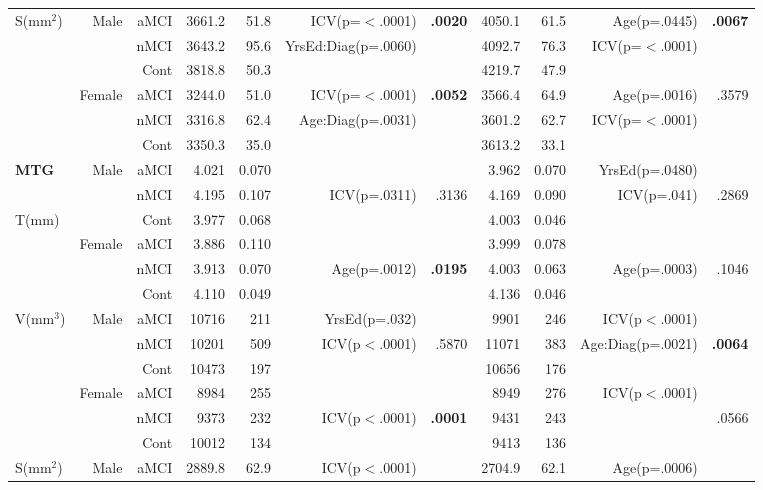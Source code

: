 \documentclass[12pt]{article}\usepackage[]{graphicx}\usepackage[]{color}
\newcommand\T{\rule{0pt}{2.6ex}}
\begin{document}
\begin{sidewaystable}
\begin{tabular}{l|rr|rrrr|rrrr}
	\hline
	\multirow{6}{*}{S(mm$^2$)} \T & \multirow{3}{*}{Male} & aMCI\T &3661.2 &51.8 & ICV(p=$<$.0001) & \textbf{.0020}&4050.1	 &61.5  & Age(p=.0445) & \textbf{.0067}  \\
							&							& nMCI & 3643.2	& 95.6	& YrsEd:Diag(p=.0060) & &4092.7 & 76.3 & ICV(p=$<$.0001) & \\
							&						& Cont & 3818.8	&50.3	& 		&  & 4219.7	& 47.9& & \\\cline{2-11}
							&	\multirow{3}{*}{Female}	& aMCI\T & 3244.0	&51.0	 & ICV(p=$<$.0001) & \textbf{.0052} & 3566.4	&64.9 & Age(p=.0016)& .3579 \\
							&						& nMCI & 3316.8	&62.4 & Age:Diag(p=.0031) & &3601.2	 & 62.7	 & ICV(p=$<$.0001) 		& \\
							&						& Cont & 3350.3& 35.0& 		& & 3613.2	& 33.1	& 		& \\
	\hline \hline
	\textbf{MTG} & \multirow{3}{*}{Male} & aMCI\T & 4.021 & 0.070 & & & 3.962 & 0.070 & YrsEd(p=.0480) & \\
							&						& nMCI & 4.195 & 0.107 & ICV(p=.0311)& .3136 & 4.169 & 0.090 & ICV(p=.041) & .2869 \\
	\multirow{2}{*}{T(mm)}						&						& Cont & 3.977 & 0.068 & & & 4.003 & 0.046 & &\\\cline{2-11}
							&	\multirow{3}{*}{Female}	& aMCI\T & 3.886 & 0.110 &  & & 3.999 & 0.078 & & \\
							&						& nMCI & 3.913 & 0.070 & Age(p=.0012)& \textbf{.0195} & 4.003 & 0.063 & Age(p=.0003) & .1046 \\
							&						& Cont & 4.110 & 0.049 & & & 4.136 & 0.046 & & \\
	\hline
	\multirow{6}{*}{V(mm$^3$)} & \multirow{3}{*}{Male} & aMCI\T & 10716 & 211 & YrsEd(p=.032)&  & 9901 & 246 & ICV(p$<$.0001) &  \\
							&						& nMCI & 10201 & 509 & ICV(p$<$.0001) & .5870 & 11071 & 383 & Age:Diag(p=.0021) & \textbf{.0064} \\
							&						& Cont & 10473 & 197 & & & 10656 & 176 & & \\\cline{2-11}
							&	\multirow{3}{*}{Female}	& aMCI\T & 8984 & 255 &  &   & 8949 & 276 & ICV(p$<$.0001)&  \\
							&						& nMCI & 9373 & 232 & ICV(p$<$.0001) & \textbf{.0001} & 9431 & 243 & & .0566\\
							&						& Cont & 10012 & 134 & & & 9413 & 136 & & \\
	\hline
	\multirow{6}{*}{S(mm$^2$)} & \multirow{3}{*}{Male} & aMCI\T & 2889.8 & 62.9 & ICV(p$<$.0001) &  & 2704.9 & 62.1 & Age(p=.0006) &\\

\end{tabular}
\end{sidewaystable}
\end{document}
